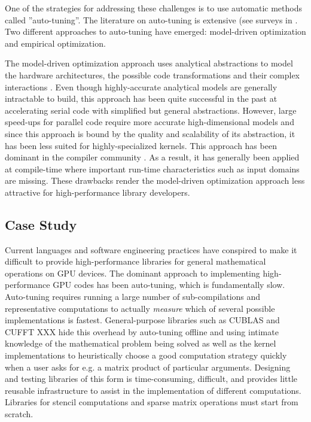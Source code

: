 \documentclass{sig-alternate}
\begin{document}
One of the strategies for addressing these challenges is to use automatic
methods called ''auto-tuning''. The literature on auto-tuning is extensive (see
surveys in \cite{XXX}. Two different approaches to auto-tuning have emerged:
model-driven optimization and empirical optimization.

The model-driven optimization approach uses analytical abstractions to model
the hardware architectures, the possible code transformations and their complex
interactions \cite{XXX}. Even though highly-accurate analytical models are
generally intractable to build, this approach has been quite successful in the
past at accelerating serial code \cite{XXX} with simplified but general
abstractions. However, large speed-ups for parallel code require more accurate
high-dimensional models and since this approach is bound by the quality and
scalability of its abstraction, it has been less suited for highly-specialized
kernels. This approach has been dominant in the compiler community \cite{XXX}.
As a result, it has generally been applied at compile-time where important
run-time characteristics such as input domains are missing. These drawbacks
render the model-driven optimization approach less attractive for
high-performance library developers.




\subsection{Case Study}
Current languages and software engineering practices have conspired to make it difficult
to provide high-performance libraries for general mathematical operations on GPU devices.
The dominant approach to implementing high-performance GPU codes has been auto-tuning,
which is fundamentally slow. Auto-tuning requires running a large number of
sub-compilations and representative computations to actually {\em measure} which
of several possible implementations is fastest. General-purpose libraries such
as CUBLAS and CUFFT XXX hide this overhead by auto-tuning offline and using
intimate knowledge of the mathematical problem being solved as well as the
kernel implementations to heuristically choose a good computation strategy quickly when a
user asks for e.g. a matrix product of particular arguments.
Designing and testing libraries of this form is time-consuming, difficult, and provides little
reusable infrastructure to assist in the implementation of different computations.
Libraries for stencil computations and sparse matrix operations must start from scratch.
\end{document}
